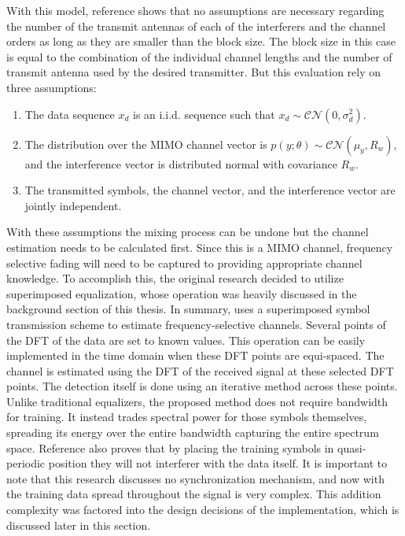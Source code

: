 With this model, reference \cite{midterm_report} shows that no assumptions are necessary regarding the number of the transmit antennas of each of the interferers and the channel orders as long as they are smaller than the block size.  The block size in this case is equal to the combination of the individual channel lengths and the number of transmit antenna used by the desired transmitter.  But this evaluation rely on three assumptions:

\begin{enumerate}
\item The data sequence \(x_{d}\) is an i.i.d. sequence such that \(x_{d}\sim\mathcal{CN}(0,\sigma_{d}^{2})\).

\item The distribution over the MIMO channel vector is \(p(y;\theta)\sim\mathcal{CN}(\mu_{y},R_{w})\), and the interference vector is distributed normal with covariance \(R_{w}\).

\item The transmitted symbols, the channel vector, and the interference vector are jointly independent.
\end{enumerate}

With these assumptions the mixing process can be undone but the channel estimation needs to be calculated first.  Since this is a MIMO channel, frequency selective fading will need to be captured to providing appropriate channel knowledge.  To accomplish this, the original research decided to utilize superimposed equalization, whose operation was heavily discussed in the background section of this thesis.  In summary, \cite{Ghogho} uses a superimposed symbol transmission scheme to estimate frequency-selective channels. Several points of the DFT of the data are set to known values. This operation can be easily implemented in the time domain when these DFT points are equi-spaced. The channel is estimated using the DFT of the received signal at these selected DFT points. The detection itself is done using an iterative method across these points.  Unlike traditional equalizers, the proposed method does not require bandwidth for training.  It instead trades spectral power for those symbols themselves, spreading its energy over the entire bandwidth capturing the entire spectrum space.  Reference \cite{Ghogho} also proves that by placing the training symbols in quasi-periodic position they will not interferer with the data itself.  It is important to note that this research discusses no synchronization mechanism, and now with the training data spread throughout the signal is very complex.  This addition complexity was factored into the design decisions of the implementation, which is discussed later in this section.\\

